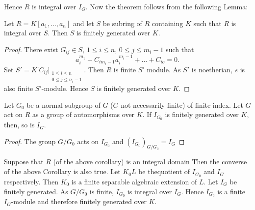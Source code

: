 Hence $R$ is integral over $I_G$. Now  the  theorem   follows  from
the  following  Lemma: 

\begin{lemma*}
  Let $R=K[a_1, \ldots , a_n]$ and let  $S$ be  subring of $R$
  containing  $K$ such  that  $R$  is integral  over $S$. Then $S$ is
  finitely generated over $K$. 
\end{lemma*}

\begin{proof}
 There exist  $G_{ij} \in  S$, $1 \leq  i \leq  n$,  $0 \leq  j \leq
 m_i  -1$ such that 
$$
a_i^{m_1} + C_{i m_i - 1} a_i^{m_i-1}+ \ldots + C_{i o} =0.
$$
Set  $S' =K\bigg[C_{ij}\bigg]_{\substack{1 \leq i \leq n \\ 0 \le j \le
    n_i - 1}}$. Then $R$ is finite $S'$ module. As $S'$ is noetherian,
$s$ is also  finite  $S'$-module. Hence  $S$  is finitely generated over
$K$. 
\end{proof}

\begin{coro*}
 Let $G_0$ be a normal subgroup  of $G$ ($G$ not  necessarily finite)
 of finite  index. Let  $G$ act  on $R$ as a group  of automorphisms
 over $K$.  If  $I_{G_0}$ is  finitely generated over $K$, then, so
 is $I_G$. 
\end{coro*}

\begin{proof}
 The group $G/ G_0$ acts on $I_{G_0}$  and  $(I_{G_0})_{G/ G_0} = I_G$ 
\end{proof}

\begin{remark*}
 Suppose that $R$ (of the above corollary) is an integral domain  Then
 the  converse of the above  Corollary  is also  true. Let  $K_0 L$ be
 the\pageoriginale quotient of $I_{G_0}$ and $I_G$ respectively. Then
 $K_0$ is a finite separable algebraic extension of $L$. Let  $I_G$ be
 finitely generated. As $G/ G_0$ is finite, $I_{G_0}$ is integral over  
 $I_G$. Hence  $I_{G_0}$ is a finite $I_G$-module  and therefore
 finitely generated over $K$. 
\end{remark*}

